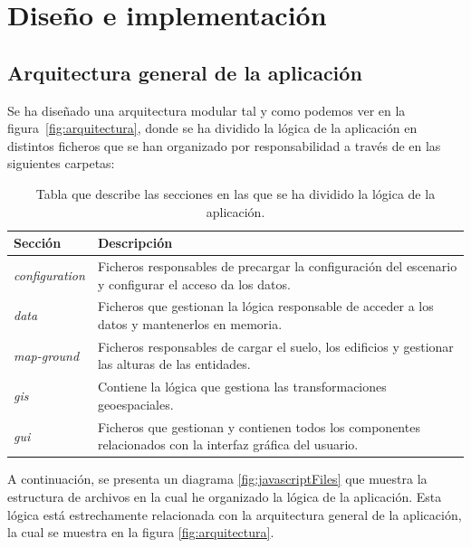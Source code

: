 \documentclass[a4paper, 11pt]{book}
\begin{document}

\clearpage


\chapter{Diseño e implementación}
\label{sec:diseno}
\section{Arquitectura general de la aplicación} 
\label{sec:arquitectura}
Se ha diseñado una arquitectura modular tal y como podemos ver en la figura~\ref{fig:arquitectura}, donde se ha dividido la lógica de la aplicación en distintos ficheros que se han organizado por responsabilidad a través de en las siguientes carpetas:
\begin{table}[h]
	\begin{center}
		\begin{tabular}{|l|p{13cm}|}
			\hline
			\textbf{Sección} & \textbf{Descripción} \\
			\hline
			\emph{configuration} & Ficheros responsables de precargar la configuración del escenario y configurar el acceso da los datos. \\\hline
			\emph{data} & Ficheros que gestionan la lógica responsable de acceder a los datos y mantenerlos en memoria. \\\hline
			\emph{map-ground} & Ficheros responsables de cargar el suelo, los edificios y gestionar las alturas de las entidades. \\\hline
			\emph{gis} & Contiene la lógica que gestiona las transformaciones geoespaciales. \\\hline
			\emph{gui} & Ficheros que gestionan y contienen todos los componentes relacionados con la interfaz gráfica del usuario.\\\hline
		\end{tabular}
		\caption{Tabla que describe las secciones en las que se ha dividido la lógica de la aplicación.}
	\end{center}
\end{table}
A continuación, se presenta un diagrama \ref{fig:javascriptFiles} que muestra la estructura de archivos en la cual he organizado la lógica de la aplicación. 
Esta lógica está estrechamente relacionada con la arquitectura general de la aplicación, la cual se muestra en la figura \ref{fig:arquitectura}. 
\end{document}
